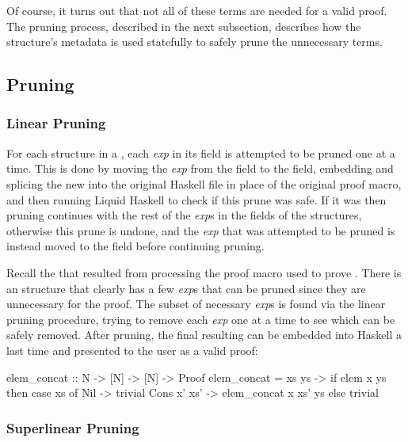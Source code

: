 Of course, it turns out that not all of these terms are needed for a valid proof.
The pruning process, described in the next subsection, describes how the  structure's metadata is used statefully to safely prune the unnecessary terms.
  
\subsection{Pruning}

\subsubsection{Linear Pruning}

For each  structure in a \LangBTerm, each \textit{exp} in its  field is attempted to be pruned one at a time.
This is done by moving the \textit{exp} from the  field to the  field, embedding and splicing the new \LangBTerm into the original Haskell file in place of the original proof macro, and then running Liquid Haskell to check if this prune was safe.
If it was then pruning continues with the rest of the \textit{exp}s in the  fields of the  structures, otherwise this prune is undone, and the \textit{exp} that was attempted to be pruned is instead moved to the  field before continuing pruning.

Recall the \LangBTerm that resulted from processing the proof macro used to prove .
There is an  structure that clearly has a few \textit{exp}s that can be pruned since they are unnecessary for the proof.
The subset of necessary \textit{exp}s is found via the linear pruning procedure, trying to remove each \textit{exp} one at a time to see which can be safely removed.
After pruning, the final resulting \LangBTerm can be embedded into Haskell a last time and presented to the user as a valid proof:

\begin{code}
  elem_concat :: N -> [N] -> [N] -> Proof
  elem_concat = \x xs ys ->
    if elem x ys then
      case xs of
        Nil -> trivial
        Cons x' xs' -> elem_concat x xs' ys
    else
      trivial
\end{code}


\subsubsection{Superlinear Pruning}

